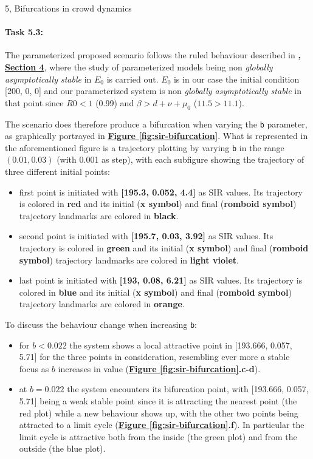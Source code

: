 \documentclass[10pt,a4paper]{article}
\begin{document}
\begin{task}{5, Bifurcations in crowd dynamics}
\paragraph{Task 5.3:}
The parameterized proposed scenario follows the ruled behaviour described in \textbf{\hyperref[kuznetsov]{\cite{kuznetsov}, Section 4}}, where the study of  parameterized models being non \textit{globally asymptotically stable} in $E_0$ is carried out. $E_0$ is in our case the initial condition [200, 0, 0] and our parameterized system is non \textit{globally asymptotically stable} in that point since $R0 < 1$ (0.99) and $\beta > d + \nu + \mu_0$ ($11.5 > 11.1$). 

The scenario does therefore produce a bifurcation when varying the \texttt{b} parameter, as graphically portrayed in \textbf{\hyperref[fig:sir-bifurcation]{Figure \ref{fig:sir-bifurcation}}}.
What is represented in the aforementioned figure is a trajectory plotting by varying \texttt{b} in the range $(0.01, 0.03)$ (with 0.001 as step), with each subfigure showing the trajectory of three different initial points:
\begin{itemize}
    \item first point is initiated with \textbf{[195.3, 0.052, 4.4]} as SIR values. Its trajectory is colored in \textbf{red} and its initial (\textbf{x symbol}) and final (\textbf{romboid symbol}) trajectory landmarks are colored in \textbf{black}.
    \item second point is initiated with \textbf{[195.7, 0.03, 3.92]} as SIR values. Its trajectory is colored in \textbf{green} and its initial (\textbf{x symbol}) and final (\textbf{romboid symbol}) trajectory landmarks are colored in \textbf{light violet}.
    \item last point is initiated with \textbf{[193, 0.08, 6.21]} as SIR values. Its trajectory is colored in \textbf{blue} and its initial (\textbf{x symbol}) and final (\textbf{romboid symbol}) trajectory landmarks are colored in \textbf{orange}.
\end{itemize}
To discuss the behaviour change when increasing \texttt{b}:
\begin{itemize}
    \item for \textbf{$b < 0.022$} the system shows a local attractive point in [193.666, 0.057, 5.71] for the three points in consideration, resembling ever more a stable focus as $b$ increases in value (\textbf{\hyperref[fig:sir-bifurcation]{Figure \ref{fig:sir-bifurcation}}.c-d}). 
    \item at \textbf{$b = 0.022$} the system encounters its bifurcation point, with [193.666, 0.057, 5.71] being a weak stable point since it is attracting the nearest point (the red plot) while a new behaviour shows up, with the other two points being attracted to a limit cycle (\textbf{\hyperref[fig:sir-bifurcation]{Figure \ref{fig:sir-bifurcation}}.f}). In particular the limit cycle is attractive both from the inside (the green plot) and from the outside (the blue plot). 

\end{itemize}
\end{task}
\end{document}
